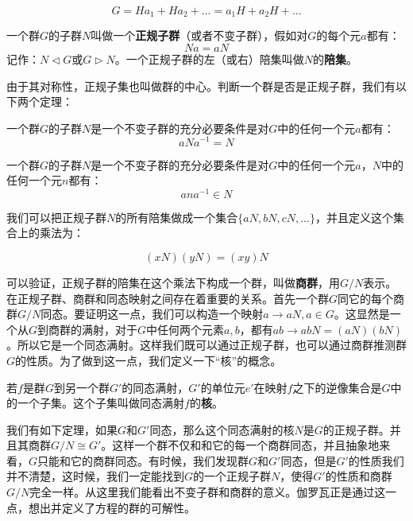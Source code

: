 \documentclass[b5paper]{ctexart}
\begin{document}
\[
G = H a_1 + H a_2 + ... = a_1 H + a_2 H + ...
\]

 
\begin{definition}
一个群$G$的子群$N$叫做一个\textbf{正规子群}（或者不变子群），假如对$G$的每个元$a$都有：
\[
Na = aN
\]
记作：$N \lhd G$或$G \rhd N$。一个正规子群的左（或右）陪集叫做$N$的\textbf{陪集}。
\label{normal-subgroup}
\end{definition}

由于其对称性，正规子集也叫做群的中心。判断一个群是否是正规子群，我们有以下两个定理：

\begin{theorem}
一个群$G$的子群$N$是一个不变子群的充分必要条件是对$G$中的任何一个元$a$都有：
\[
aNa^{-1} = N
\]
\end{theorem}

\begin{theorem}
一个群$G$的子群$N$是一个不变子群的充分必要条件是对$G$中的任何一个元$a$，$N$中的任何一个元$n$都有：
\[
ana^{-1} \in N
\]
\end{theorem}

我们可以把正规子群$N$的所有陪集做成一个集合$\{aN, bN, cN, ...\}$，并且定义这个集合上的乘法为：

\[
(xN)(yN) = (xy)N
\]

可以验证，正规子群的陪集在这个乘法下构成一个群，叫做\textbf{商群}，用$G/N$表示。在正规子群、商群和同态映射之间存在着重要的关系。首先一个群$G$同它的每个商群$G/N$同态。要证明这一点，我们可以构造一个映射$a \to aN, a \in G$。这显然是一个从$G$到商群的满射，对于$G$中任何两个元素$a, b$，都有$ab \to abN = (aN)(bN)$。所以它是一个同态满射。这样我们既可以通过正规子群，也可以通过商群推测群$G$的性质。为了做到这一点，我们定义一下“核”的概念。

\begin{definition}
若$f$是群$G$到另一个群$G'$的同态满射，$G'$的单位元$e'$在映射$f$之下的逆像集合是$G$中的一个子集。这个子集叫做同态满射$f$的\textbf{核}。
\end{definition}

我们有如下定理，如果$G$和$G'$同态，那么这个同态满射的核$N$是$G$的正规子群。并且其商群$G/N \cong G'$。这样一个群不仅和和它的每一个商群同态，并且抽象地来看，$G$只能和它的商群同态。有时候，我们发现群$G$和$G'$同态，但是$G'$的性质我们并不清楚，这时候，我们一定能找到$G$的一个正规子群$N$，使得$G'$的性质和商群$G/N$完全一样。从这里我们能看出不变子群和商群的意义。伽罗瓦正是通过这一点，想出并定义了方程的群的可解性。

\begin{Exercise}
\end{Exercise}
\end{document}
